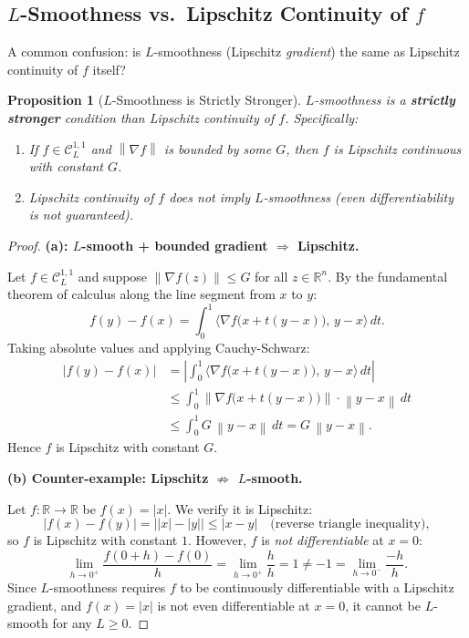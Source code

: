 \documentclass[11pt]{article}
\theoremstyle{definition}
\theoremstyle{plain}
\newtheorem{proposition}{Proposition}
\newcommand{\R}{\mathbb{R}}
\newcommand{\norm}[1]{\left\|#1\right\|}
\newcommand{\inner}[2]{\langle #1,\, #2\rangle}
\newcommand{\grad}{\nabla}
\begin{document}
\subsection{$L$-Smoothness vs.\ Lipschitz Continuity of $f$}

A common confusion: is $L$-smoothness (Lipschitz \emph{gradient})
the same as Lipschitz continuity of $f$ itself?

\begin{proposition}[$L$-Smoothness is Strictly Stronger]\label{prop:smooth_implies_lip}
$L$-smoothness is a \textbf{strictly stronger} condition than
Lipschitz continuity of $f$. Specifically:
\begin{enumerate}
  \item[(a)] If $f\in\mathcal{C}^{1,1}_L$ and $\norm{\grad f}$ is bounded
    by some $G$, then $f$ is Lipschitz continuous with constant $G$.
  \item[(b)] Lipschitz continuity of $f$ does \emph{not} imply $L$-smoothness
    (even differentiability is not guaranteed).
\end{enumerate}
\end{proposition}

\begin{proof}
\textbf{(a): $L$-smooth + bounded gradient $\Rightarrow$ Lipschitz.}

Let $f\in\mathcal{C}^{1,1}_L$ and suppose $\norm{\grad f(z)}\leq G$ for all $z\in\R^n$.
By the fundamental theorem of calculus along the line segment from $x$ to $y$:
\[
  f(y) - f(x) = \int_0^1 \inner{\grad f\bigl(x+t(y-x)\bigr)}{y-x}\,dt.
\]
Taking absolute values and applying Cauchy-Schwarz:
\begin{align*}
  |f(y)-f(x)|
  &= \left|\int_0^1 \inner{\grad f\bigl(x+t(y-x)\bigr)}{y-x}\,dt\right| \\
  &\leq \int_0^1 \norm{\grad f\bigl(x+t(y-x)\bigr)}\cdot\norm{y-x}\,dt \\
  &\leq \int_0^1 G\,\norm{y-x}\,dt
  = G\,\norm{y-x}.
\end{align*}
Hence $f$ is Lipschitz with constant $G$.

\medskip
\textbf{(b) Counter-example: Lipschitz $\not\Rightarrow$ $L$-smooth.}

Let $f:\R\to\R$ be $f(x)=|x|$. We verify it is Lipschitz:
\[
  |f(x)-f(y)| = \bigl||x|-|y|\bigr| \leq |x-y|
  \quad\text{(reverse triangle inequality)},
\]
so $f$ is Lipschitz with constant $1$. However, $f$ is \emph{not differentiable} at $x=0$:
\[
  \lim_{h\to 0^+}\frac{f(0+h)-f(0)}{h} = \lim_{h\to 0^+}\frac{h}{h} = 1 \neq -1 = \lim_{h\to 0^-}\frac{-h}{h}.
\]
Since $L$-smoothness requires $f$ to be continuously differentiable with a Lipschitz gradient,
and $f(x)=|x|$ is not even differentiable at $x=0$, it cannot be $L$-smooth for any $L\geq 0$.
\end{proof}
\end{document}
